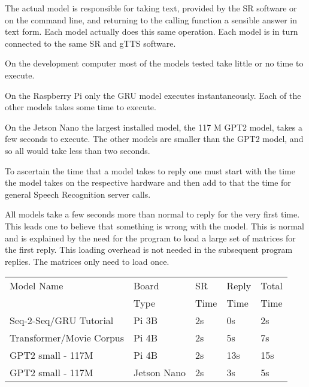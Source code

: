 The actual model is responsible for taking text, provided by the SR software or on the command line, and returning to the calling function a sensible answer in text form. Each model actually does this same operation. Each model is in turn connected to the same SR and gTTS software.

On the development computer most of the models tested take little or no time to execute.

On the Raspberry Pi only the GRU model executes instantaneously. Each of the other models takes some time to execute.

On the Jetson Nano the largest installed model, the 117 M GPT2 model, takes a few seconds to execute. The other models are smaller than the GPT2 model, and so all would take less than two seconds.

To ascertain the time that a model takes to reply one must start with the time the model takes on the respective hardware and then add to that the time for general Speech Recognition server calls.

All models take a few seconds more than normal to reply for the very first time. This leads one to believe that something is wrong with the model. This is normal and is explained by the need for the program to load a large set of matrices for the first reply. This loading overhead is not needed in the subsequent program replies. The matrices only need to load once.

\label{setup-reply-time}

\begin{table}[H]
	
	\begin{center}
		
		
		\begin{tabular}{lllll}
			
			Model Name    & Board  & SR  & Reply    & Total  \\
			&  Type & Time  & Time    & Time  \\
			\hline
			\hline
			Seq-2-Seq/GRU Tutorial & Pi 3B     & 2s & 0s             & 2s   \\
			Transformer/Movie Corpus & Pi 4B      & 2s & 5s  & 7s      \\
			GPT2 small - 117M   & Pi 4B     & 2s   & 13s         & 15s      \\
			GPT2 small - 117M   & Jetson Nano & 2s   & 3s         & 5s      \\
			\hline
		\end{tabular}
		
		\bigskip
	\end{center}
	
	
	\label{fig:time-compare}
\end{table}


